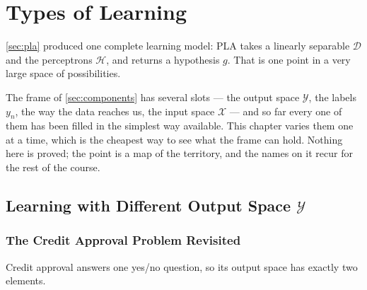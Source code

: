 \chapter{Types of Learning}

\begin{prev}
    \autoref{sec:pla} produced one complete learning model: PLA takes a linearly
    separable \(\mathcal{D}\) and the perceptrons \(\mathcal{H}\), and returns a
    hypothesis \(g\). That is one point in a very large space of possibilities.
\end{prev}

The frame of \autoref{sec:components} has several slots --- the output space
\(\mathcal{Y}\), the labels \(y_n\), the way the data reaches us, the input space
\(\mathcal{X}\) --- and so far every one of them has been filled in the simplest
way available. This chapter varies them one at a time, which is the cheapest way
to see what the frame can hold. Nothing here is proved; the point is a map of
the territory, and the names on it recur for the rest of the course.

\section{Learning with Different Output Space
\texorpdfstring{\(\mathcal{Y}\)}{Y}}\label{sec:outspace}


\subsection{The Credit Approval Problem Revisited}

Credit approval answers one yes/no question, so its output space has exactly two
elements.


